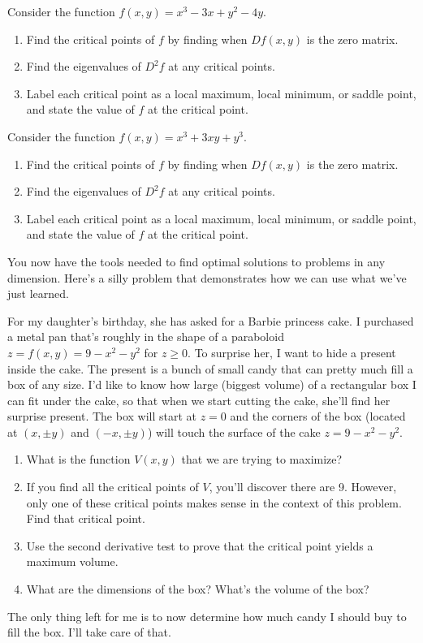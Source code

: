 \begin{problem}
Consider the function $f(x,y)=x^3-3x+y^2-4y$.  
\begin{enumerate}
 \item Find the critical points of $f$ by finding when $Df(x,y)$ is the zero matrix.
 \item Find the eigenvalues of $D^2f$ at any critical points.
 \item Label each critical point as a local maximum, local minimum, or saddle point, and state the value of $f$ at the critical point.
\end{enumerate}
\end{problem}

\begin{problem}
Consider the function $f(x,y)=x^3 + 3xy +y^3$.  
\begin{enumerate}
 \item Find the critical points of $f$ by finding when $Df(x,y)$ is the zero matrix.
 \item Find the eigenvalues of $D^2f$ at any critical points.
 \item Label each critical point as a local maximum, local minimum, or saddle point, and state the value of $f$ at the critical point.
\end{enumerate}
\end{problem}

You now have the tools needed to find optimal solutions to problems in any dimension. Here's a silly problem that demonstrates how we can use what we've just learned.

\begin{problem}\label{optimize box in cake}
For my daughter's birthday, she has asked for a Barbie princess cake. I purchased a metal pan that's roughly in the shape of a paraboloid $z=f(x,y)=9-x^2-y^2$ for $z\geq 0$. To surprise her, I want to hide a present inside the cake. The present is a bunch of small candy that can pretty much fill a box of any size.  I'd like to know how large (biggest volume) of a rectangular box I can fit under the cake, so that when we start cutting the cake, she'll find her surprise present. The box will start at $z=0$ and the corners of the box (located at $(x,\pm y)$ and $(-x,\pm y)$) will touch the surface of the cake $z=9-x^2-y^2$.  
\begin{enumerate}
 \item What is the function $V(x,y)$ that we are trying to maximize?
 \item If you find all the critical points of $V$, you'll discover there are 9.  However, only one of these critical points makes sense in the context of this problem. Find that critical point.
 \item Use the second derivative test to prove that the critical point yields a maximum volume.
 \item What are the dimensions of the box? What's the volume of the box?
\end{enumerate}
 The only thing left for me is to now determine how much candy I should buy to fill the box. I'll take care of that.
\end{problem}
 
